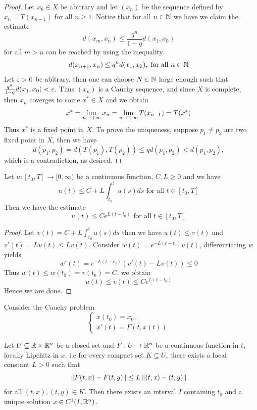 \begin{proof}
    Let $x_0 \in X$ be abitrary and let $(x_n)$ be the sequence defined by $x_n = T(x_{n - 1})$ for all $n \geq 1$. Notice that for all $n \in \mathbb{N}$ we have we claim the estimate 
    \[
        d(x_m,x_n) \leq \frac{q^n}{1 - q}d(x_1,x_0)
    \]
    for all $m > n$ can be reached by using the inequality 
    \[
        d(x_{n + 1}, x_n)\leq q^nd(x_1,x_0), \text{ for all }n \in \mathbb{N}
    \]
    Let $\varepsilon > 0$ be abitrary, then one can choose $N \in \mathbb{N}$ large enough such that $\frac{q^n}{1 - q}d(x_1,x_0) < \varepsilon$. Thus $(x_n)$ is a Cauchy sequence, and since $X$ is complete, then $x_n$ coverges to some $x^* \in X$ and we obtain 
    \[  
        x^* = \displaystyle \lim_{n \to +\infty} x_n = \displaystyle \lim_{n \to +\infty} T(x_{n - 1}) = T(x^*)
    \]
    Thus $x^*$ is a fixed point in $X$. To prove the uniqueness, suppose $p_1 \neq p_2$ are two fixed point in $X$, then we have 
    \[
        d(p_1,p_2) = d(T(p_1),T(p_2)) \leq qd(p_1,p_2) < d(p_1,p_2),
    \]
    which is a contradiction, as desired.
\end{proof}
\begin{theorem}
    Let $u: [t_0,T] \to [0,\infty)$ be a continuous function, $C,L \geq 0$ and we have 
    \[
        u(t) \leq C + L\int_{t_0}^tu(s) ds \text{ for all } t \in [t_0,T]
    \]
    Then we have the estimate 
    \[
    u(t) \leq Ce^{L(t - t_0)}\text{ for all } t \in [t_0,T]
    \]
\end{theorem}
\begin{proof}
    Let $v(t) = C + L\int_{t_0}^tu(s) ds$ then we have $u(t) \leq v(t)$ and $v'(t) = Lu(t) \leq  Lv(t)$. Consider $w(t) = e^{-L(t - t_0)}v(t)$, differentiating $w$ yields 
    \[
         w'(t) = e^{-L(t - t_0)}(v'(t) - Lv(t)) \leq 0
    \]
    Thus $w(t) \leq w(t_0) = v(t_0) = C$, we obtain
    \[
        u(t) \leq v(t) \leq Ce^{L(t - t_0)}
    \]
    Hence we are done.
\end{proof}
\begin{theorem}
    Consider the Cauchy problem 
    \begin{equation}
        \begin{cases}
        x(t_0) = x_0,\\
        x'(t) =F(t,x(t))
    \end{cases}
    \end{equation}

    Let $U \subseteq \mathbb{R} \times \mathbb{R}^n$ be a closed set and $F: U \to \mathbb{R}^n$ be a continuous function in $t$, locally Lipchitz in $x$, i.e for every compact set $K \subseteq U$, there exists a local constant $L > 0$ such that
    \[
        \left\lVert F(t,x) - F(t,y) \right\rVert\leq L\left\lVert (t,x) -(t,y) \right\rVert
    \]
    for all $(t,x), (t,y) \in K$. Then there exists an interval $I$ containing $t_0$ and a unique solution $x \in C^1(I, \mathbb{R}^n)$.
\end{theorem}

